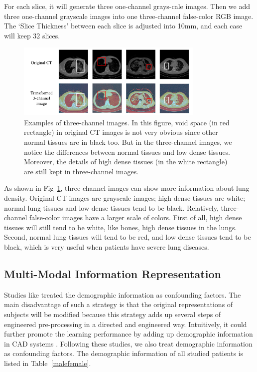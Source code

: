 \documentclass[journal]{IEEEtran}
\begin{document}
For each slice, it will generate three one-channel grays-cale images. Then we add three one-channel grayscale images into one three-channel false-color RGB image. The `Slice Thickness' between each slice is adjusted into 10mm, and each case will keep 32 slices.
\begin{figure}[htbp]
    \centerline{\includegraphics[width=90mm]{3channel2.pdf}}
    \vspace{-0cm}
    \caption{Examples of three-channel images. In this figure, void space (in red rectangle) in original CT images is not very obvious since other normal tissues are in black too. But in the three-channel images, we notice the differences between normal tissues and low dense tissues. Moreover, the details of high dense tissues (in the white rectangle) are still kept in three-channel images.}
    \vspace{-0cm}
    \label{3channel}

    \end{figure}
As shown in Fig~\ref{3channel}, three-channel images can show more information about lung density. Original CT images are grayscale images; high dense tissues are white; normal lung tissues and low dense tissues tend to be black. 
Relatively, three-channel false-color images have a larger scale of colors. First of all, high dense tissues will still tend to be white, like bones, high dense tissues in the lungs. Second, normal lung tissues will tend to be red, and low dense tissues tend to be black, which is very useful when patients have severe lung diseases.

\subsection{Multi-Modal Information Representation}
Studies like \cite{dukart2011age, de2016machine} treated the demographic information as confounding factors. The main disadvantage of such a strategy is that the original representations of subjects will be modified because this strategy adds up several steps of engineered pre-processing in a directed and engineered way. Intuitively, it could further promote the learning performance by adding up demographic information in CAD systems \cite{liu2018joint}.
Following these studies, we also treat demographic information as confounding factors. The demographic information of all studied patients is listed in Table~\ref{malefemale}.
\end{document}
